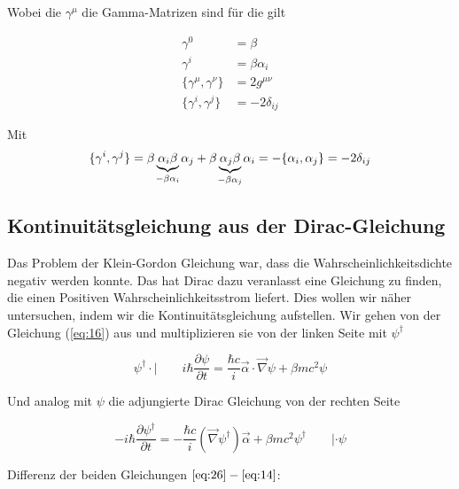 Wobei die \(\gamma^\mu\) die Gamma-Matrizen sind für die gilt

\begin{equation}
  \label{eq:24}
  \boxed{
  \begin{aligned}
    \gamma^0 &= \beta \\
    \gamma^i &= \beta\alpha_i \\
    \{\gamma^\mu, \gamma^\nu\}&=2g^{\mu\nu}\\
    \{\gamma^i, \gamma^j\}&=-2\delta_{ij}
  \end{aligned}}
\end{equation}

Mit
\begin{equation}
  \label{eq:25}
  \{\gamma^i, \gamma^j\}=\beta\underbr{\alpha_i\beta}_{-\beta\alpha_i}\alpha_j
  +\beta\underbr{\alpha_j\beta}_{-\beta\alpha_j}\alpha_i=-\{\alpha_i, \alpha_j\}=-2\delta_{ij}
\end{equation}




\subsection*{Kontinuitätsgleichung aus der Dirac-Gleichung}

Das Problem der Klein-Gordon Gleichung war, dass die Wahrscheinlichkeitsdichte negativ werden konnte. Das hat Dirac dazu veranlasst eine Gleichung zu finden, die einen Positiven Wahrscheinlichkeitsstrom liefert. Dies wollen wir näher untersuchen, indem wir die Kontinuitätsgleichung aufstellen. Wir gehen von der Gleichung (\ref{eq:16}) aus und multiplizieren sie von der linken Seite mit \(\psi^\dagger\)


\begin{equation}
  \label{eq:26}
  \psi^\dagger\cdot|\qquad i\hbar \frac{\partial \psi}{\partial t} = \frac{\hbar c}{i}\vec \alpha\cdot\vec\nabla\psi+\beta mc^2\psi
\end{equation}

Und analog mit \(\psi\) die adjungierte Dirac Gleichung von der rechten Seite

\begin{equation}
  \label{eq:14}
  -i\hbar \frac{\partial \psi^\dagger}{\partial t} = -\frac{\hbar c}{i}(\vec\nabla\psi^\dagger)\vec \alpha+\beta mc^2\psi^\dagger \qquad |\cdot \psi
\end{equation}


Differenz der beiden Gleichungen \(\ref{eq:26}-\ref{eq:14}\):

